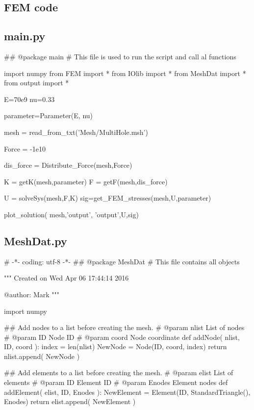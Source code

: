 
\begin{appendices}

\chapter{FEM code}
\label{AppA}
\section{main.py}

\begin{spverbatim}
## @package main
#  This file is used to run the script and call al functions

import numpy
from FEM  import *
from IOlib import *
from MeshDat import *
from output import *


E=70e9
nu=0.33

parameter=Parameter(E, nu)

mesh = read_from_txt('Mesh/MultiHole.msh')

Force = -1e10

dis_force = Distribute_Force(mesh,Force)

K = getK(mesh,parameter)
F = getF(mesh,dis_force)

U = solveSys(mesh,F,K)
sig=get_FEM_stresses(mesh,U,parameter)

plot_solution( mesh,'output', 'output',U,sig)

\end{spverbatim}


\section{MeshDat.py}
\begin{spverbatim}
# -*- coding: utf-8 -*-
## @package MeshDat
#  This file contains all objects

"""
Created on Wed Apr 06 17:44:14 2016

@author: Mark
"""

import numpy 

## Add nodes to a list before creating the mesh.
#  @param nlist  List of nodes
#  @param ID     Node ID
#  @param coord  Node coordinate
def addNode( nlist, ID, coord ):
    index = len(nlist)
    NewNode = Node(ID, coord, index)
    return nlist.append( NewNode )

## Add elements to a list before creating the mesh.
#  @param elist  List of elements
#  @param ID     Element ID
#  @param Enodes Element nodes
def addElement( elist, ID, Enodes ):
    NewElement = Element(ID, StandardTriangle(), Enodes)
    return elist.append( NewElement )


\end{spverbatim}
\end{appendices}
